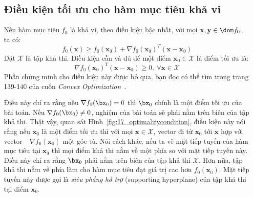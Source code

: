 \subsection{Điều kiện tối ưu cho hàm mục tiêu khả vi}
 
Nếu hàm mục tiêu $f_0$ là khả vi, theo điều kiện bậc nhất, với mọi
$\mathbf{x}, \mathbf{y} \in \dom f_0$, ta có: 
\begin{equation} 
f_0(\mathbf{x}) \geq f_0(\mathbf{x}_0) + \nabla f_0(\mathbf{x}_0)^T (\mathbf{x} - \mathbf{x}_0)
\end{equation} 
Đặt $\mathcal{X}$ là tập khả thi. {Điều kiện cần và đủ} để một điểm $\mathbf{x}_0 \in \mathcal{X}$ là điểm tối ưu là: 
\begin{equation} 
\nabla f_0(\mathbf{x}_0)^T(\mathbf{x} - \mathbf{x}_0) \geq 0, ~\forall \mathbf{x} \in \mathcal{X} 
\end{equation} 
Phần chứng minh cho điều kiện này được bỏ qua, bạn đọc có thể tìm trong trang
139-140 của cuốn \textit{Convex Optimization}~\cite{boyd2004convex}.


Điều này chỉ ra rằng nếu $\nabla f_0(\bx_0) = 0$ thì $\bx_0$ chính là một điểm
tối ưu của bài toán. Nếu $\nabla f_0(\bx_0) \neq 0$, nghiệm của bài toán sẽ
phải nằm trên biên của tập khả thi. Thật vậy, quan sát
Hình~\ref{fig:17_optimalitycondition}, điều kiện này nói rằng nếu $\mathbf{x}_0$
là một điểm tối ưu thì với mọi $\mathbf{x} \in \mathcal{X}$, vector đi từ
$\mathbf{x}_0$ tới $\mathbf{x}$ hợp với vector $-\nabla f_0 (\mathbf{x}_0)$ một
góc tù. Nói cách khác, nếu ta vẽ {mặt tiếp tuyến} của hàm mục tiêu tại
$\mathbf{x}_0$ thì mọi điểm {khả thi} nằm về một phía so với {mặt tiếp tuyến
này}. Điều này chỉ ra rằng $\bx_0$ phải nằm trên biên của tập khả thi
$\mathcal{X}$. Hơn nữa, tập khả thi nằm về phía làm cho hàm mục tiêu đạt giá
trị cao
hơn $f_0(\mathbf{x}_0)$. Mặt tiếp tuyến này được gọi là \textit{siêu phẳng hỗ trợ} ({supporting hyperplane}) của tập khả thi tại điểm $\mathbf{x}_0$.

